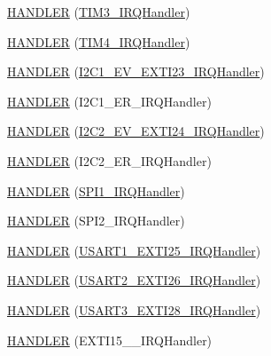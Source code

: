 \begin{DoxyCompactItemize}
\hyperlink{group___p_i_o_s_gaecb039356f5447d178398ce19716a5e5}{H\-A\-N\-D\-L\-E\-R} (\hyperlink{group___p_i_o_s___t_i_m_gac8e51d2183b5230cbd5481f8867adce9}{T\-I\-M3\-\_\-\-I\-R\-Q\-Handler})
\item 
\hyperlink{group___p_i_o_s_ga69c3c91cb4931a9f27a7ec197bd442eb}{H\-A\-N\-D\-L\-E\-R} (\hyperlink{group___p_i_o_s___t_i_m_ga7133f3f78767503641d307386e68bd28}{T\-I\-M4\-\_\-\-I\-R\-Q\-Handler})
\item 
\hyperlink{group___p_i_o_s_ga3f576078381cc740c5f4fd50e26d7312}{H\-A\-N\-D\-L\-E\-R} (\hyperlink{group___tau_labs_core_ga40edacd7797186e686829d1c3b43f4bc}{I2\-C1\-\_\-\-E\-V\-\_\-\-E\-X\-T\-I23\-\_\-\-I\-R\-Q\-Handler})
\item 
\hyperlink{group___p_i_o_s_gaa3febcc5f3cd972c88b93057bb941f52}{H\-A\-N\-D\-L\-E\-R} (I2\-C1\-\_\-\-E\-R\-\_\-\-I\-R\-Q\-Handler)
\item 
\hyperlink{group___p_i_o_s_ga4ef23887f4ca8f231e4e7d5dac1e6490}{H\-A\-N\-D\-L\-E\-R} (\hyperlink{group___tau_labs_core_ga860bdffadc546e3969c31b9b00c5d29c}{I2\-C2\-\_\-\-E\-V\-\_\-\-E\-X\-T\-I24\-\_\-\-I\-R\-Q\-Handler})
\item 
\hyperlink{group___p_i_o_s_gae93e0ca64a1196614305e8fb0f934cc6}{H\-A\-N\-D\-L\-E\-R} (I2\-C2\-\_\-\-E\-R\-\_\-\-I\-R\-Q\-Handler)
\item 
\hyperlink{group___p_i_o_s_ga62abd0a75fff43f7a3275a2ced1d32f0}{H\-A\-N\-D\-L\-E\-R} (\hyperlink{group___tau_labs_core_ga9bbd8c17ce4f49adcca47d11f482aab6}{S\-P\-I1\-\_\-\-I\-R\-Q\-Handler})
\item 
\hyperlink{group___p_i_o_s_gaacd1f2576272d789637f863ad084d0c5}{H\-A\-N\-D\-L\-E\-R} (S\-P\-I2\-\_\-\-I\-R\-Q\-Handler)
\item 
\hyperlink{group___p_i_o_s_ga15f854d07581b79a46522cf9462291bc}{H\-A\-N\-D\-L\-E\-R} (\hyperlink{group___p_i_o_s___u_s_a_r_t_ga9da740f6a7dda252db44255f54a3bee3}{U\-S\-A\-R\-T1\-\_\-\-E\-X\-T\-I25\-\_\-\-I\-R\-Q\-Handler})
\item 
\hyperlink{group___p_i_o_s_ga619c0fe57e74452982f8b139d23c958d}{H\-A\-N\-D\-L\-E\-R} (\hyperlink{group___p_i_o_s___u_s_a_r_t_ga4897c2dbb8e8ae70938922276f95800b}{U\-S\-A\-R\-T2\-\_\-\-E\-X\-T\-I26\-\_\-\-I\-R\-Q\-Handler})
\item 
\hyperlink{group___p_i_o_s_ga7b00a01c76ff4fe321f382353a91f177}{H\-A\-N\-D\-L\-E\-R} (\hyperlink{group___p_i_o_s___u_s_a_r_t_gaab980dd8a502127dc3ae895e77931bdd}{U\-S\-A\-R\-T3\-\_\-\-E\-X\-T\-I28\-\_\-\-I\-R\-Q\-Handler})
\item 
\hyperlink{group___p_i_o_s_ga612a35f8a94a6280c13843868268c306}{H\-A\-N\-D\-L\-E\-R} (E\-X\-T\-I15\-\_\-\_\-\-I\-R\-Q\-Handler)

\end{DoxyCompactItemize}
